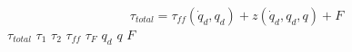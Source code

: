 \documentclass[fleqn]{article}
\begin{document}
\setlength{\mathindent}{-4.5cm}
\begin{equation}
\tau_{total} = \tau_{ff}(\dot{q}_d,q_d)+z(\dot{q}_d,q_d,q)+F
\end{equation}
$\tau_{total}$ \linebreak \linebreak
$\tau_1$ \linebreak \linebreak
$\tau_2$ \linebreak \linebreak
$\tau_{ff}$ \linebreak \linebreak
$\tau_F$ \linebreak \linebreak
$q_d$ \linebreak \linebreak
$q$ \linebreak \linebreak
$F$
\end{document}
